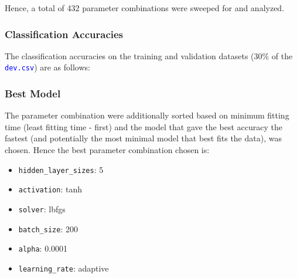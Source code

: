 \documentclass[11pt,a4paper]{article}
\newcommand{\noi}{\noindent}
\def\tt#1{\texttt{#1}}
\def\colortt#1{\textcolor{blue}{\texttt{#1}}}
\begin{document}
\noi
Hence, a total of 432 parameter combinations were sweeped for and analyzed.

\subsubsection{Classification Accuracies}
The classification accuracies on the training and validation datasets (30\% of the \colortt{dev.csv}) are as follows:


\subsubsection{Best Model}
The parameter combination were additionally sorted based on minimum fitting time (least fitting time - first) and the model that gave the best accuracy the fastest (and potentially the most minimal model that best fits the data), was chosen. Hence the best parameter combination chosen is:
\begin{itemize}
    \itemsep0em
    \item \tt{hidden\_layer\_sizes}: 5
    \item \tt{activation}: tanh
    \item \tt{solver}: lbfgs
    \item \tt{batch\_size}: 200
    \item \tt{alpha}: 0.0001
    \item \tt{learning\_rate}: adaptive
\end{itemize}
\end{document}
